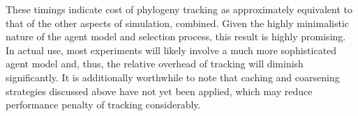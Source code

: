 These timings indicate cost of phylogeny tracking as approximately equivalent to that of the other aspects of simulation, combined.
Given the highly minimalistic nature of the agent model and selection process, this result is highly promising.
In actual use, most experiments will likely involve a much more sophisticated agent model and, thus, the relative overhead of tracking will diminish significantly.
It is additionally worthwhile to note that caching and coarsening strategies discussed above have not yet been applied, which may reduce performance penalty of tracking considerably.

